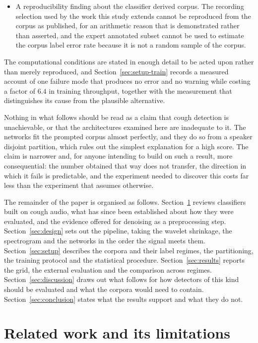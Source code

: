 \documentclass{ieeeaccess}
\begin{document}
\begin{itemize}
\item A reproducibility finding about the classifier derived corpus. The recording
      selection used by the work this study extends cannot be reproduced from the corpus as
      published, for an arithmetic reason that is demonstrated rather than asserted, and
      the expert annotated subset cannot be used to estimate the corpus label error rate
      because it is not a random sample of the corpus.

\end{itemize}

The computational conditions are stated in enough detail to be acted upon rather than
merely reproduced, and Section~\ref{sec:setup-train} records a measured account of one
failure mode that produces no error and no warning while costing a factor of $6.4$ in
training throughput, together with the measurement that distinguishes its cause from the
plausible alternative.

Nothing in what follows should be read as a claim that cough detection is unachievable, or
that the architectures examined here are inadequate to it. The networks fit the prompted
corpus almost perfectly, and they do so from a speaker disjoint partition, which rules out
the simplest explanation for a high score. The claim is narrower and, for anyone intending
to build on such a result, more consequential: the number obtained that way does not
transfer, the direction in which it fails is predictable, and the experiment needed to
discover this costs far less than the experiment that assumes otherwise.

The remainder of the paper is organised as follows.
Section~\ref{sec:related} reviews classifiers built on cough audio, what has since been
established about how they were evaluated, and the evidence offered for denoising as a
preprocessing step. Section~\ref{sec:design} sets out the pipeline, taking the wavelet
shrinkage, the spectrogram and the networks in the order the signal meets them.
Section~\ref{sec:setup} describes the corpora and their label regimes, the partitioning,
the training protocol and the statistical procedure. Section~\ref{sec:results} reports the
grid, the external evaluation and the comparison across regimes.
Section~\ref{sec:discussion} draws out what follows for how detectors of this kind should
be evaluated and what the corpora would need to contain.
Section~\ref{sec:conclusion} states what the results support and what they do not.

\section{Related work and its limitations}\label{sec:related}
\end{document}
